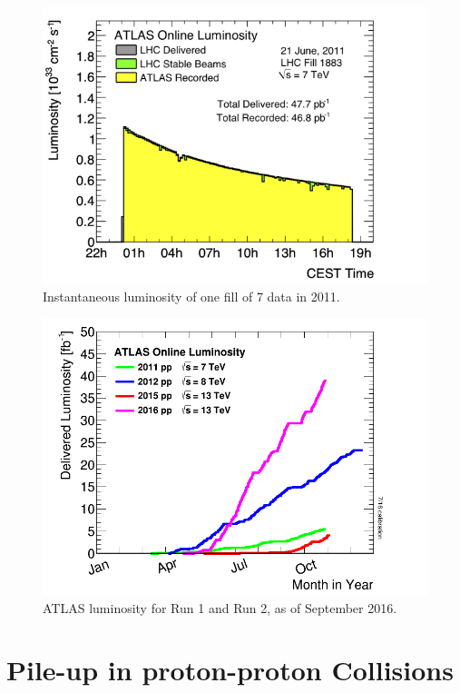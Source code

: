 \begin{centering}
\begin{figure}[!hbt]
\myfloatalign
\includegraphics[width=.90\linewidth]{figures/lhc/lumi1883.jpg}
\caption{Instantaneous luminosity of one fill of 7 \tev data in 2011.}
\label{fig:instlumi}
\end{figure}
\end{centering}

\begin{centering}
\begin{figure}[!hbt]
\myfloatalign
\includegraphics[width=.90\linewidth]{figures/lhc/intlumivsyear.png}
\caption{\ac{ATLAS} luminosity for Run 1 and Run 2, as of September 2016.}
\label{fig:lumi_vs_year}
\end{figure} 
\end{centering}

\section{Pile-up in proton-proton Collisions}
\label{sec:pileup}

